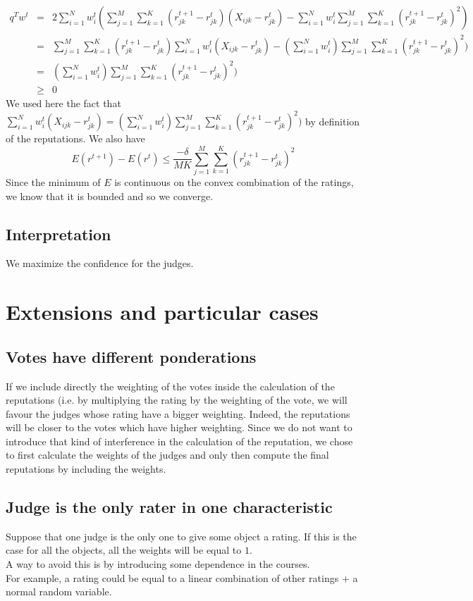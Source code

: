 \documentclass[12pt,a4paper]{article}
\begin{document}
\begin{eqnarray*}
q^Tw^t & = & 2 \sum_{i=1}^N w^t_i (\sum_{j=1}^M \sum_{k=1}^K (r^{t+1}_{jk}-r^t_{jk})(X_{ijk}-r^t_{jk}) - \sum_{i=1}^N w^t_i \sum_{j=1}^M \sum_{k=1}^K  (r^{t+1}_{jk} - r^t_{jk})^2)\\
& = & \sum_{j=1}^M \sum_{k=1}^K (r^{t+1}_{jk}-r^t_{jk}) \sum_{i=1}^N w^t_i (X_{ijk}-r_{jk}^t)- (\sum_{i=1}^N w^t_i) \sum_{j=1}^M \sum_{k=1}^K  (r^{t+1}_{jk} - r^t_{jk})^2)\\
& = & (\sum_{i=1}^N w^t_i) \sum_{j=1}^M \sum_{k=1}^K  (r^{t+1}_{jk} - r^t_{jk})^2)\\
& \geq & 0
\end{eqnarray*}
We used here the fact that $\sum_{i=1}^N w^t_i (X_{ijk}-r_{jk}^t) = (\sum_{i=1}^N w^t_i) \sum_{j=1}^M \sum_{k=1}^K  (r^{t+1}_{jk} - r^t_{jk})^2)$ by definition of the reputations.
We also have 
$$E(r^{t+1})- E(r^t) \leq \frac{-\delta}{MK} \sum_{j=1}^M \sum_{k=1}^K (r^{t+1}_{jk} - r^t_{jk})^2$$
Since the minimum of $E$ is continuous on the convex combination of the ratings, we know that it is bounded and so we converge.
\subsection{Interpretation}
We maximize the confidence for the judges.

\section{Extensions and particular cases}
\subsection{Votes have different ponderations}
If we include directly the weighting of the votes inside the calculation of the reputations (i.e. by multiplying the rating by the weighting of the vote, we will favour the judges whose rating have a bigger weighting. Indeed, the reputations will be closer to the votes which have higher weighting. Since we do not want to introduce that kind of interference in the calculation of the reputation, we chose to first calculate the weights of the judges and only then compute the final reputations by including the weights.
\subsection{Judge is the only rater in one characteristic}
Suppose that one judge is the only one to give some object a rating. If this is the case for all the objects, all the weights will be equal to $1$.\\
A way to avoid this is by introducing some dependence in the courses.\\
For example, a rating could be equal to a linear combination of other ratings + a normal random variable.
\end{document}
